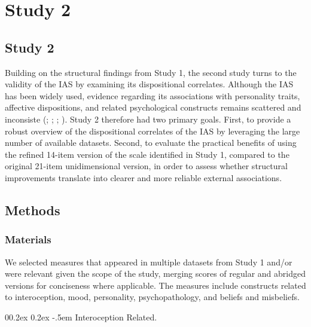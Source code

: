 \documentclass[
  jou,
  floatsintext,
  longtable,
  nolmodern,
  notxfonts,
  notimes,
  colorlinks=true,linkcolor=blue,citecolor=blue,urlcolor=blue]{apa7}
\makeatletter
\renewcommand{\paragraph}{\@startsection{paragraph}{4}{\parindent}%
	{0\baselineskip \@plus 0.2ex \@minus 0.2ex}%
	{-.5em}%
	{\normalfont\normalsize\bfseries\typesectitle}}
\makeatother
\begin{document}
\section{Study 2}\label{study-2}

\subsection{Study 2}\label{study-2-1}

Building on the structural findings from Study 1, the second study turns
to the validity of the IAS by examining its dispositional correlates.
Although the IAS has been widely used, evidence regarding its
associations with personality traits, affective dispositions, and
related psychological constructs remains scattered and inconsiste
(;
;
;
). Study 2 therefore had two
primary goals. First, to provide a robust overview of the dispositional
correlates of the IAS by leveraging the large number of available
datasets. Second, to evaluate the practical benefits of using the
refined 14-item version of the scale identified in Study 1, compared to
the original 21-item unidimensional version, in order to assess whether
structural improvements translate into clearer and more reliable
external associations.

\subsection{Methods}\label{methods-1}

\subsubsection{Materials}\label{materials}

We selected measures that appeared in multiple datasets from Study 1
and/or were relevant given the scope of the study, merging scores of
regular and abridged versions for conciseness where applicable. The
measures include constructs related to interoception, mood, personality,
psychopathology, and beliefs and misbeliefs.

\paragraph{Interoception Related.}\label{interoception-related}
\end{document}
